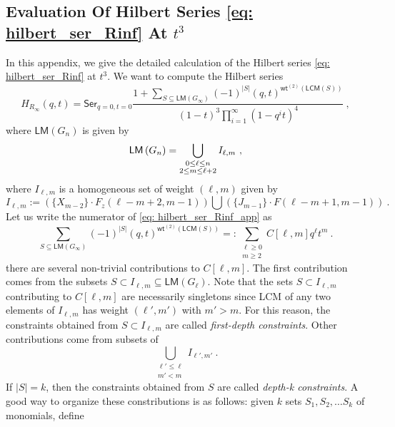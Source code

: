 \documentclass[a4paper,10pt]{article}
\newcommand{\mr}[1]{\mathsf{#1}}
\newcommand{\tsf}[1]{\textsf{#1}}
\begin{document}
\begin{appendix}
\section{Evaluation Of Hilbert Series \eqref{eq: hilbert_ser_Rinf} At $t^3$}\label{app:Hilb_ser_t3}
In this appendix, we give the detailed calculation of the Hilbert series \eqref{eq: hilbert_ser_Rinf} at $t^3$. We want to compute the Hilbert series 
\begin{equation}
\label{eq: hilbert_ser_Rinf_app}
H_{R_\infty}(q,t) = \mr{Ser}_{q=0,t=0}\frac{1+\sum_{S\subseteq \mr{LM}(G_\infty)}(-1)^{|S|}(q,t)^{\mr{wt}^{(2)}(\mr{LCM}(S))}}{(1-t)^3 \prod_{i=1}^{\infty}\left(1-q^i t\right)^4}~,
\end{equation}
where $\mr{LM}(G_n)$ is given by
\begin{equation}
\label{eq:Gr\"{o}bner_basis_Gn_app}
\mr{LM}\left(G_n\right)=\bigcup_{\substack{0 \leq \ell \leq n \\ 2 \leq m \leq \ell+2}} I_{\ell, m}~,
\end{equation}
where $I_{\ell,m}$ is a homogeneous set of weight $(\ell,m)$ given by
\begin{equation}
I_{\ell,m} := \left(\{X_{m-2}\}\cdot F_z(\ell-m+2, m-1)\right)\bigcup \left(\{J_{m-1}\}\cdot F(\ell-m+1, m-1)\right)~.
\end{equation}
Let us write the numerator of \eqref{eq: hilbert_ser_Rinf_app} as
\begin{equation}
\sum_{S \subseteq \mr{L M}\left(G_{\infty}\right)}(-1)^{|S|}(q, t)^{\mr{wt}^{(2)}(\mr{LCM}(S))}=: \sum_{\substack{\ell \geq 0\\ m\geq2}} C[\ell,m]q^\ell t^m~.
\end{equation}
there are several non-trivial contributions to $C[\ell, m]$. The first contribution comes from the subsets $S\subset I_{\ell,m}\subseteq \mr{LM}(G_\ell)$. Note that the sets $S\subset I_{\ell,m}$ contributing to $C[\ell,m]$ are necessarily singletons since \tsf{LCM} of any two elements of $I_{\ell,m}$ has weight $(\ell',m')$ with $m'>m$. For this reason, the constraints obtained from $S\subset I_{\ell,m}$ are called \textit{first-depth constraints}. Other contributions come from subsets of 
\begin{equation}
\bigcup_{\substack{\ell'\leq \ell\\m'<m}}I_{\ell',m'}~.    
\end{equation}
If $|S|=k$, then the constraints obtained from $S$ are called \textit{depth-k constraints}. A good way to organize these constributions is as follows: given $k$ sets $S_1,S_2,\dots S_k$ of monomials, define

\end{appendix}
\end{document}
